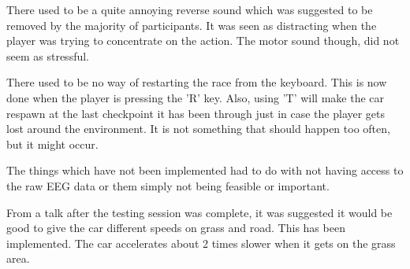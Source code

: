 There used to be a quite annoying reverse sound which was suggested to be removed by the majority of participants. It was seen as distracting when the player was trying to concentrate on the action. The motor sound though, did not seem as stressful.

There used to be no way of restarting the race from the keyboard. This is now done when the player is pressing the 'R' key. Also, using 'T' will make the car respawn at the last checkpoint it has been through just in case the player gets lost around the environment. It is not something that should happen too often, but it might occur.

The things which have not been implemented had to do with not having access to the raw EEG data or them simply not being feasible or important.

From a talk after the testing session was complete, it was suggested it would be good to give the car different speeds on grass and road. This has been implemented. The car accelerates about 2 times slower when it gets on the grass area.